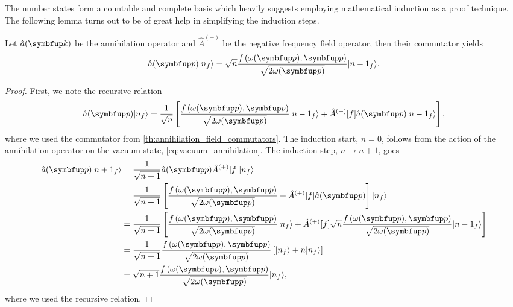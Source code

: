 The number states form a countable and complete basis which heavily suggests employing mathematical induction as a proof technique.
The following lemma turns out to be of great help in simplifying the induction steps.
\begin{lemma}\label{th:number_annihilation}
	Let $\hat{a}(\vb{k})$ be the annihilation operator and $\hat{A}^{(-)}$ be the negative frequency field operator, then their commutator yields
	\begin{equation}
		\hat{a}(\vb{p})
		\ket{n_f}
		=
		\sqrt{n}
		\frac{f\left(\omega(\vb{p}),\vb{p}\right)}{\sqrt{2\omega(\vb{p})}}
		\ket{{n-1}_f}
		\label{eq:number_annihilation}
		.
	\end{equation}
\end{lemma}
\begin{proof}
	First, we note the recursive relation
	\begin{equation}
		\hat{a}(\vb{p})
		\ket{n_f}
		=
		\frac{1}{\sqrt{n}}
		\left[
			\frac{f\left(\omega(\vb{p}),\vb{p}\right)}{\sqrt{2\omega(\vb{p})}}
			\ket{{n-1}_f}
			+
			\hat{A}^{(+)}[f]
			\hat{a}(\vb{p})
			\ket{{n-1}_f}
		\right]
		,
	\end{equation}
	where we used the commutator from \cref{th:annihilation_field_commutators}.
	The induction start, $n=0$, follows from the action of the annihilation operator on the vacuum state, \cref{eq:vacuum_annihilation}.
	The induction step, $n\to n+1$, goes
	\begin{equation}
		\begin{split}
			\hat{a}(\vb{p})
			\ket{{n+1}_f}
			&=
			\frac{1}{\sqrt{n+1}}
			\hat{a}(\vb{p})
			\hat{A}^{(+)}[f]
			\ket{n_f}
			\\
			&=
			\frac{1}{\sqrt{n+1}}
			\left[
				\frac{f\left(\omega(\vb{p}),\vb{p}\right)}{\sqrt{2\omega(\vb{p})}}
				+
				\hat{A}^{(+)}[f]
				\hat{a}(\vb{p})
			\right]
			\ket{n_f}
			\\
			&=
			\frac{1}{\sqrt{n+1}}
			\left[
				\frac{f\left(\omega(\vb{p}),\vb{p}\right)}{\sqrt{2\omega(\vb{p})}}
				\ket{n_f}
				+
				\hat{A}^{(+)}[f]
				\sqrt{n}
				\frac{f\left(\omega(\vb{p}),\vb{p}\right)}{\sqrt{2\omega(\vb{p})}}
				\ket{{n-1}_f}
			\right]
			\\
			&=
			\frac{1}{\sqrt{n+1}}
			\frac{f\left(\omega(\vb{p}),\vb{p}\right)}{\sqrt{2\omega(\vb{p})}}
			\left[
				\ket{n_f}
				+
				n
				\ket{n_f}
			\right]
			\\
			&=
			\sqrt{n+1}
			\frac{f\left(\omega(\vb{p}),\vb{p}\right)}{\sqrt{2\omega(\vb{p})}}
			\ket{n_f}
			,
		\end{split}
	\end{equation}
	where we used the recursive relation.
\end{proof}
